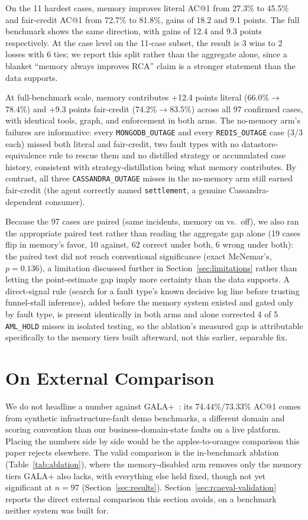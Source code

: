\documentclass[conference]{IEEEtran}
\begin{document}
On the 11 hardest cases, memory improves literal AC@1 from 27.3\% to 45.5\% and fair-credit AC@1 from 72.7\% to
81.8\%, gains of 18.2 and 9.1 points. The full benchmark shows the same direction, with gains of 12.4 and 9.3
points respectively. At the case level on the 11-case subset, the result is 3 wins to 2 losses with 6 ties; we
report this split rather than the aggregate alone, since a blanket ``memory always improves RCA'' claim is a
stronger statement than the data supports.

At full-benchmark scale, memory contributes +12.4 points literal (66.0\%$\to$78.4\%) and +9.3 points fair-credit
(74.2\%$\to$83.5\%) across all 97 confirmed cases, with identical tools, graph, and enforcement in both arms.
The no-memory arm's failures are informative: every \texttt{MONGODB\_OUTAGE} and every \texttt{REDIS\_OUTAGE}
case (3/3 each) missed both literal and fair-credit, two fault types with no datastore-equivalence rule to
rescue them and no distilled strategy or accumulated case history, consistent with strategy-distillation being
what memory contributes. By contrast, all three \texttt{CASSANDRA\_OUTAGE} misses in the no-memory arm still
earned fair-credit (the agent correctly named \texttt{settlement}, a genuine Cassandra-dependent consumer).

Because the 97 cases are paired (same incidents, memory on vs.\ off), we also ran the appropriate paired test
rather than reading the aggregate gap alone (19 cases flip in memory's favor, 10 against, 62 correct under both,
6 wrong under both): the paired test did not reach conventional significance (exact McNemar's, $p=0.136$), a
limitation discussed further in Section~\ref{sec:limitations} rather than letting the point-estimate gap imply
more certainty than the data supports. A direct-signal rule (search for a fault type's known decisive log
line before trusting funnel-stall inference), added before the memory system existed and gated only by fault
type, is present identically in both arms and alone corrected 4 of 5 \texttt{AML\_HOLD} misses in isolated
testing, so the ablation's measured gap is attributable specifically to the memory tiers built afterward, not
this earlier, separable fix.

\section{On External Comparison}
\label{sec:gala-comparison}

We do not headline a number against GALA+~\cite{gala}: its 74.44\%/73.33\% AC@1 comes from synthetic
infrastructure-fault demo benchmarks, a different domain and scoring convention than our business-domain-state
faults on a live platform. Placing the numbers side by side would be the apples-to-oranges comparison this
paper rejects elsewhere. The valid comparison is the in-benchmark ablation (Table~\ref{tab:ablation}), where the
memory-disabled arm removes only the memory tiers GALA+ also lacks, with everything else held fixed, though not yet
significant at $n=97$ (Section~\ref{sec:results}). Section~\ref{sec:rcaeval-validation} reports the direct
external comparison this section avoids, on a benchmark neither system was built for.
\end{document}
